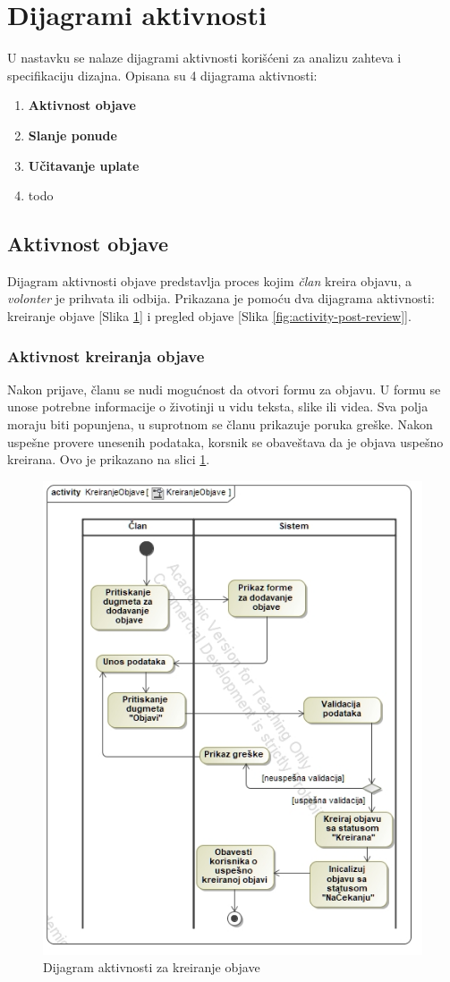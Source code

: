 \section{Dijagrami aktivnosti}
\par U nastavku se nalaze dijagrami aktivnosti korišćeni za analizu zahteva i specifikaciju dizajna.
Opisana su 4 dijagrama aktivnosti:
\begin{enumerate}
    \item \textbf{Aktivnost objave}
    \item \textbf{Slanje ponude}
    \item \textbf{Učitavanje uplate}
    \item todo
\end{enumerate}
\subsection{Aktivnost objave}
\par Dijagram aktivnosti objave predstavlja proces kojim \textit{član} kreira objavu, a \textit{volonter} je prihvata ili odbija.
Prikazana je pomoću dva dijagrama aktivnosti: kreiranje objave [Slika \ref{fig:activity-create-post}] i pregled objave [Slika \ref{fig:activity-post-review}].
\subsubsection*{Aktivnost kreiranja objave}
\par Nakon prijave, članu se nudi mogućnost da otvori formu za objavu. U formu se unose potrebne informacije o životinji u vidu teksta, slike ili videa.
Sva polja moraju biti popunjena, u suprotnom se članu prikazuje poruka greške. Nakon uspešne provere unesenih podataka, korsnik se obaveštava da je 
objava uspešno kreirana. Ovo je prikazano na slici \ref{fig:activity-create-post}.
\begin{figure}[h]
    \centering
    \includegraphics[width=\textwidth, height=0.75\textwidth]{img/activity-create-post.jpg}
    \caption{Dijagram aktivnosti za kreiranje objave}
    \label{fig:activity-create-post}
\end{figure}
